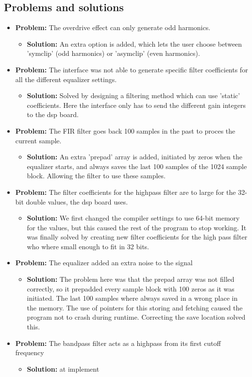 \subsection{Problems and solutions}
\begin{itemize}
\item \textbf{Problem:} The overdrive effect can only generate odd harmonics.
\begin{itemize}
\item \textbf{Solution:} An extra option is added, which lets the user choose between 'symclip' (odd harmonics) or 'asymclip' (even harmonics).
\end{itemize}
\item \textbf{Problem:} The interface was not able to generate specific filter coefficients for all the different equalizer settings.
\begin{itemize}
\item \textbf{Solution:} Solved by designing a filtering method which can use 'static' coefficients. Here the interface only has to send the different gain integers to the dsp board.
\end{itemize}
\item \textbf{Problem:} The FIR filter goes back 100 samples in the past to proces the current sample. 
\begin{itemize}
\item \textbf{Solution:} An extra 'prepad' array is added, initiated by zeros when the equalizer starts, and always saves the last 100 samples of the 1024 sample block. Allowing the filter to use these samples.
\end{itemize}
\item \textbf{Problem:} The filter coefficients for the highpass filter are to large for the 32-bit double values, the dsp board uses.
\begin{itemize}
\item \textbf{Solution:} We first changed the compiler settings to use 64-bit memory for the values, but this caused the rest of the program to stop working. It was finally solved by creating new filter coefficients for the high pass filter who where small enough to fit in 32 bits.
\end{itemize}
\item \textbf{Problem:} The equalizer added an extra noise to the signal
\begin{itemize}
\item \textbf{Solution:} The problem here was that the prepad array was not filled correctly, so it prepadded every sample block with 100 zeros as it was initiated. The last 100 samples where always saved in a wrong place in the memory. The use of pointers for this storing and fetching caused the program not to crash during runtime. Correcting the save location solved this.
\end{itemize}
\item \textbf{Problem:} The bandpass filter acts as a highpass from its first cutoff frequency
\begin{itemize}
\item \textbf{Solution:} at implement
\end{itemize}
\end{itemize}
